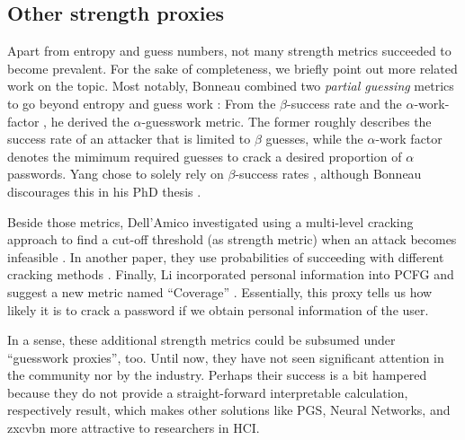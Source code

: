 	\subsection{Other strength proxies}
	Apart from entropy and guess numbers, not many strength metrics succeeded to become prevalent. For the sake of completeness, we briefly point out more related work on the topic. Most notably, Bonneau combined two \textit{partial guessing} metrics to go beyond entropy and guess work \cite{Bonneau2012ScienceOfGuessing}: From the $\beta$-success rate \cite{Boztas1999Entropies} and the $\alpha$-work-factor \cite{Pliam2000IncomparabilityEntropyGuesswork}, he derived the $\alpha$-guesswork metric. The former roughly describes the success rate of an attacker that is limited to $\beta$ guesses, while the $\alpha$-work factor denotes the mimimum required guesses to crack a desired proportion of $\alpha$ passwords. Yang \etal chose to solely rely on $\beta$-success rates \cite{Yang2016MnemonicSentenceBased}, although Bonneau discourages this in his PhD thesis \cite{Bonneau2012Thesis}. 
	
	Beside those metrics, Dell'Amico \etal investigated using a multi-level cracking approach to find a cut-off threshold (as strength metric) when an attack becomes infeasible \cite{DellAmico2010PasswordStrength}. In another paper, they use probabilities of succeeding with different cracking methods \cite{Dellamico2015MonteCarlo}. Finally, Li \etal incorporated personal information into PCFG and suggest a new metric named ``Coverage'' \cite{Li2017PersonalInformation}. Essentially, this proxy tells us how likely it is to crack a password if we obtain personal information of the user.
	
	In a sense, these additional strength metrics could be subsumed under ``guesswork proxies'', too. Until now, they have not seen significant attention in the community nor by the industry. Perhaps their success is a bit hampered because they do not provide a straight-forward interpretable calculation, respectively result, which makes other solutions like PGS, Neural Networks, and zxcvbn more attractive to researchers in HCI.
	
%
	
%
%

